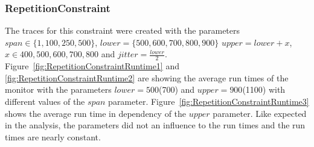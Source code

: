 \subsubsection{RepetitionConstraint}
	The traces for this constraint were created with the parameters $span\in\{1,100,250,500\}$, $lower=\{500,600,700,800,900\}$ $upper=lower+x$, $x\in{400,500,600,700,800}$ and $jitter=\frac{lower}{2}$.\\
	Figure~\ref{fig:RepetitionConstraintRuntime1} and \ref{fig:RepetitionConstraintRuntime2} are showing the average run times of the monitor with the parameters $lower=500$(700) and $upper=900$(1100) with different values of the $span$ parameter. Figure~\ref{fig:RepetitionConstraintRuntime3} shows the average run time in dependency of the $upper$ parameter. Like expected in the analysis, the parameters did not an influence to the run times and the run times are nearly constant.
